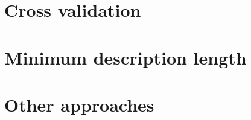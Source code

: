 \section{Cross validation}
\label{sec:Cross validation}

\section{Minimum description length}
\label{sec:Minimum description length}

\section{Other approaches}
\label{sec:Other approaches}


\ifx\inthesis\undefined
\printbibliography
\else\relax\fi
